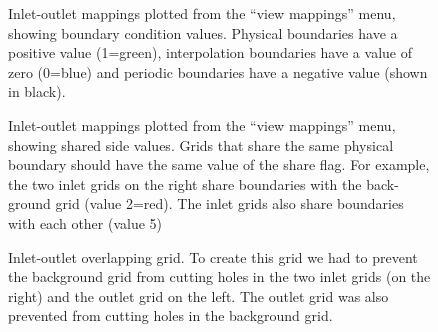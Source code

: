 \documentclass[xcolor=rgb,svgnames,dvipsnames]{article}
\newcommand{\figures}{../fig}
\begin{document}
{
\newcommand{\figWidthd}{12cm}
\newcommand{\trimfig}[2]{\trimPlot{#1}{#2}{.0}{.0}{.125}{.3}}
\begin{figure}[hbt]
\begin{center}
\end{center}
  \caption{Inlet-outlet mappings plotted from the ``view mappings'' menu, 
          showing boundary condition values. Physical boundaries have a positive value (1=green),
         interpolation boundaries have a value of zero (0=blue) and periodic boundaries have a 
      negative value (shown in black). }  \label{fig:inletOutletBC}
\end{figure}
\begin{figure}[hbt]
\begin{center}
\end{center}
  \caption{Inlet-outlet mappings plotted from the ``view mappings'' menu, 
          showing shared side values. Grids that share the same physical boundary should
     have the same value of the share flag. For example, the two inlet grids on the right
     share boundaries with the back-ground grid (value 2=red). The inlet grids also share
      boundaries with each other (value 5) }  \label{fig:inletOutletShare}
\end{figure}
\begin{figure}[hbt]
\begin{center}
\end{center}
  \caption{Inlet-outlet overlapping grid. To create this grid we had to prevent the 
      background grid from cutting holes in the two inlet grids (on the right) and the
      outlet grid on the left. The outlet grid was also prevented from cutting holes in
      the background grid.}  \label{fig:inletOutlet}
\end{figure}
}
\end{document}
